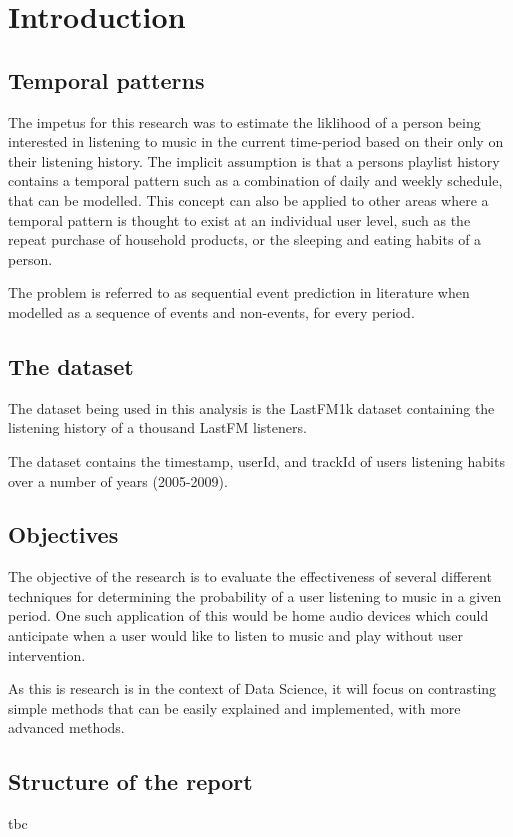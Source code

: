 
\chapter{Introduction} %

\label{Chapter1} %


\newcommand{\keyword}[1]{\textbf{#1}}
\newcommand{\tabhead}[1]{\textbf{#1}}
\newcommand{\code}[1]{\texttt{#1}}
\newcommand{\file}[1]{\texttt{\bfseries#1}}
\newcommand{\option}[1]{\texttt{\itshape#1}}


\section{Temporal patterns}
The impetus for this research was to estimate the liklihood of a person being interested in listening to music in the current time-period based on their only on their listening history. The implicit assumption is that a persons playlist history contains a temporal pattern such as a combination of daily and weekly schedule, that can be modelled. This concept can also be applied to other areas where a temporal pattern is thought to exist at an individual user level, such as the repeat purchase of household products, or the sleeping and eating habits of a person.

The problem is referred to as sequential event prediction in literature when modelled as a sequence of events and non-events, for every period. 

\section{The dataset}
The dataset being used in this analysis is the LastFM1k dataset containing the listening history of a thousand LastFM listeners.

The dataset contains the timestamp, userId, and trackId of users listening habits over a number of years (2005-2009).

\section{Objectives}
The objective of the research is to evaluate the effectiveness of several different techniques for determining the probability of a user listening to music in a given period. One such application of this would be home audio devices which could anticipate when a user would like to listen to music and play without user intervention.

As this is research is in the context of Data Science, it will focus on contrasting simple methods that can be easily explained and implemented, with more advanced methods.

\section{Structure of the report}
tbc
